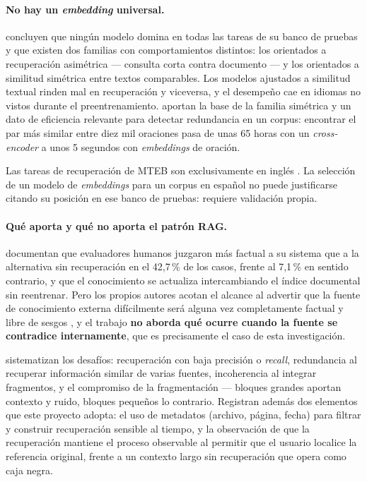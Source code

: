 \paragraph{No hay un \emph{embedding} universal.}
\textcite{muennighoff2023mteb} concluyen que ningún modelo domina en todas las tareas
de su banco de pruebas y que existen dos familias con comportamientos distintos: los
orientados a recuperación asimétrica --- consulta corta contra documento --- y los
orientados a similitud simétrica entre textos comparables. Los modelos ajustados a
similitud textual rinden mal en recuperación y viceversa, y el desempeño cae en
idiomas no vistos durante el preentrenamiento. \textcite{reimers2019sentencebert}
aportan la base de la familia simétrica y un dato de eficiencia relevante para
detectar redundancia en un corpus: encontrar el par más similar entre diez mil
oraciones pasa de unas 65 horas con un \emph{cross-encoder} a unos 5 segundos con
\emph{embeddings} de oración.

\begin{advertencia}
Las tareas de recuperación de MTEB son exclusivamente en inglés
\parencite{muennighoff2023mteb}. La selección de un modelo de \emph{embeddings} para
un corpus en español no puede justificarse citando su posición en ese banco de
pruebas: requiere validación propia.
\end{advertencia}

\paragraph{Qué aporta y qué no aporta el patrón RAG.}
\textcite{lewis2020retrieval} documentan que evaluadores humanos juzgaron más factual
a su sistema que a la alternativa sin recuperación en el 42,7\,\% de los casos, frente
al 7,1\,\% en sentido contrario, y que el conocimiento se actualiza intercambiando el
índice documental sin reentrenar. Pero los propios autores acotan el alcance al
advertir que la fuente de conocimiento externa difícilmente será alguna vez
completamente factual y libre de sesgos \parencite[p.~10]{lewis2020retrieval}, y el
trabajo \textbf{no aborda qué ocurre cuando la fuente se contradice internamente}, que
es precisamente el caso de esta investigación.

\textcite{gao2024retrieval} sistematizan los desafíos: recuperación con baja precisión
o \emph{recall}, redundancia al recuperar información similar de varias fuentes,
incoherencia al integrar fragmentos, y el compromiso de la fragmentación --- bloques
grandes aportan contexto y ruido, bloques pequeños lo contrario. Registran además dos
elementos que este proyecto adopta: el uso de metadatos (archivo, página, fecha) para
filtrar y construir recuperación sensible al tiempo, y la observación de que la
recuperación mantiene el proceso observable al permitir que el usuario localice la
referencia original, frente a un contexto largo sin recuperación que opera como caja
negra.

